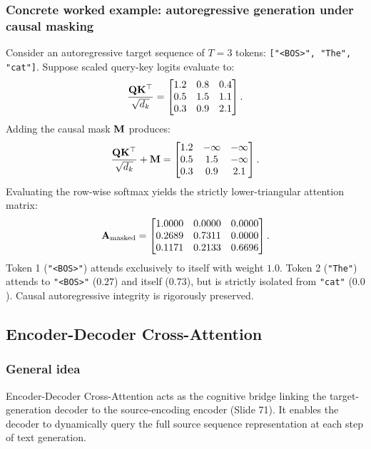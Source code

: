\documentclass[../../main.tex]{subfiles}
\begin{document}
\subsubsection{Concrete worked example: autoregressive generation under causal masking}
Consider an autoregressive target sequence of $T = 3$ tokens: \texttt{["<BOS>", "The", "cat"]}.
Suppose scaled query-key logits evaluate to:
\begin{equation}
\frac{\mathbf{Q} \mathbf{K}^\top}{\sqrt{d_k}} = \begin{bmatrix}
1.2 & 0.8 & 0.4 \\
0.5 & 1.5 & 1.1 \\
0.3 & 0.9 & 2.1
\end{bmatrix}.
\end{equation}
Adding the causal mask $\mathbf{M}$ produces:
\begin{equation}
\frac{\mathbf{Q} \mathbf{K}^\top}{\sqrt{d_k}} + \mathbf{M} = \begin{bmatrix}
1.2 & -\infty & -\infty \\
0.5 & 1.5 & -\infty \\
0.3 & 0.9 & 2.1
\end{bmatrix}.
\end{equation}
Evaluating the row-wise softmax yields the strictly lower-triangular attention matrix:
\begin{equation}
\mathbf{A}_{\text{masked}} = \begin{bmatrix}
1.0000 & 0.0000 & 0.0000 \\
0.2689 & 0.7311 & 0.0000 \\
0.1171 & 0.2133 & 0.6696
\end{bmatrix}.
\end{equation}
Token 1 (\texttt{"<BOS>"}) attends exclusively to itself with weight $1.0$. Token 2 (\texttt{"The"}) attends to \texttt{"<BOS>"} ($0.27$) and itself ($0.73$), but is strictly isolated from \texttt{"cat"} ($0.0$). Causal autoregressive integrity is rigorously preserved.

\subsection{Encoder-Decoder Cross-Attention}
\label{subsec:encoder_decoder_cross_attn}

\subsubsection{General idea}
Encoder-Decoder Cross-Attention acts as the cognitive bridge linking the target-generation decoder to the source-encoding encoder (Slide 71). It enables the decoder to dynamically query the full source sequence representation at each step of text generation.
\end{document}
